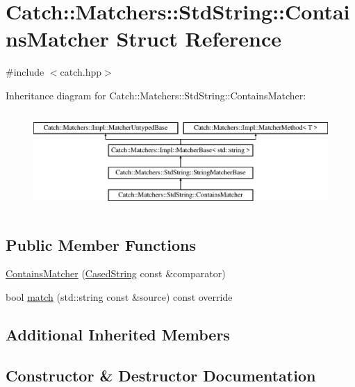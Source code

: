 \hypertarget{struct_catch_1_1_matchers_1_1_std_string_1_1_contains_matcher}{}\section{Catch\+:\+:Matchers\+:\+:Std\+String\+:\+:Contains\+Matcher Struct Reference}
\label{struct_catch_1_1_matchers_1_1_std_string_1_1_contains_matcher}


{\ttfamily \#include $<$catch.\+hpp$>$}

Inheritance diagram for Catch\+:\+:Matchers\+:\+:Std\+String\+:\+:Contains\+Matcher\+:\begin{figure}[H]
\begin{center}
\leavevmode
\includegraphics[height=3.758389cm]{struct_catch_1_1_matchers_1_1_std_string_1_1_contains_matcher}
\end{center}
\end{figure}
\subsection*{Public Member Functions}
\begin{DoxyCompactItemize}
\item 
\mbox{\hyperlink{struct_catch_1_1_matchers_1_1_std_string_1_1_contains_matcher_acc892883c8409e34b28c9b39d4ef1fe3}{Contains\+Matcher}} (\mbox{\hyperlink{struct_catch_1_1_matchers_1_1_std_string_1_1_cased_string}{Cased\+String}} const \&comparator)
\item 
bool \mbox{\hyperlink{struct_catch_1_1_matchers_1_1_std_string_1_1_contains_matcher_a630628b234b037be83fe587081a80b53}{match}} (std\+::string const \&source) const override
\end{DoxyCompactItemize}
\subsection*{Additional Inherited Members}


\subsection{Constructor \& Destructor Documentation}
\mbox{\label{struct_catch_1_1_matchers_1_1_std_string_1_1_contains_matcher_acc892883c8409e34b28c9b39d4ef1fe3}} 
